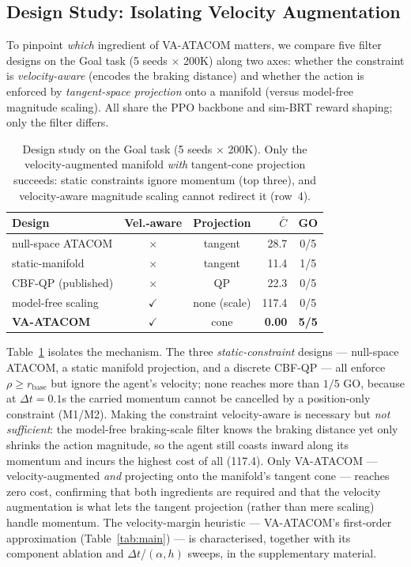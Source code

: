 \documentclass[letterpaper]{article}
\begin{document}


\subsection{Design Study: Isolating Velocity Augmentation}
\label{sec:design-study}

To pinpoint \emph{which} ingredient of VA-ATACOM matters, we compare five filter designs on the Goal task (5 seeds $\times$ 200K) along two axes: whether the constraint is \emph{velocity-aware} (encodes the braking distance) and whether the action is enforced by \emph{tangent-space projection} onto a manifold (versus model-free magnitude scaling). All share the PPO backbone and sim-BRT reward shaping; only the filter differs.

\begin{table}[t]
\centering
\caption{Design study on the Goal task (5 seeds $\times$ 200K). Only the velocity-augmented manifold \emph{with} tangent-cone projection succeeds: static constraints ignore momentum (top three), and velocity-aware magnitude scaling cannot redirect it (row~4).}
\label{tab:design}
\begin{tabular}{lcc r c}
\toprule
Design & Vel.-aware & Projection & $\bar C$ & GO \\
\midrule
null-space ATACOM   & $\times$     & tangent      & 28.7  & 0/5 \\
static-manifold     & $\times$     & tangent      & 11.4  & 1/5 \\
CBF-QP (published)  & $\times$     & QP           & 22.3  & 0/5 \\
model-free scaling  & $\checkmark$ & none (scale) & 117.4 & 0/5 \\
\textbf{VA-ATACOM}  & $\checkmark$ & cone         & \textbf{0.00} & \textbf{5/5} \\
\bottomrule
\end{tabular}
\end{table}

Table~\ref{tab:design} isolates the mechanism. The three \emph{static-constraint} designs --- null-space ATACOM, a static manifold projection, and a discrete CBF-QP --- all enforce $\rho \ge r_\text{base}$ but ignore the agent's velocity; none reaches more than $1/5$ GO, because at $\Delta t{=}0.1$s the carried momentum cannot be cancelled by a position-only constraint (M1/M2). Making the constraint velocity-aware is necessary but \emph{not sufficient}: the model-free braking-scale filter knows the braking distance yet only shrinks the action magnitude, so the agent still coasts inward along its momentum and incurs the highest cost of all (117.4). Only VA-ATACOM --- velocity-augmented \emph{and} projecting onto the manifold's tangent cone --- reaches zero cost, confirming that both ingredients are required and that the velocity augmentation is what lets the tangent projection (rather than mere scaling) handle momentum. The velocity-margin heuristic --- VA-ATACOM's first-order approximation (Table~\ref{tab:main}) --- is characterised, together with its component ablation and $\Delta t$/$(\alpha,h)$ sweeps, in the supplementary material.
\end{document}
